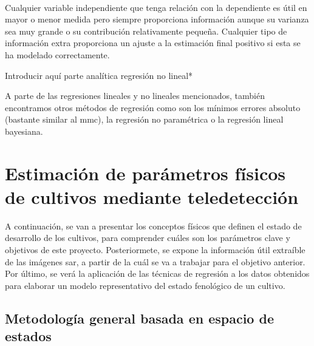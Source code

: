 \\
\par Cualquier variable independiente que tenga relación con la dependiente es útil en mayor o menor medida pero siempre proporciona información aunque su varianza sea muy grande o su contribución relativamente pequeña. Cualquier tipo de información extra proporciona un ajuste a la estimación final positivo si esta se ha modelado correctamente. 
\\
\par *Introducir aquí parte analítica regresión no lineal*
\\
\par A parte de las regresiones lineales y no lineales mencionados, también encontramos otros métodos de regresión como son los mínimos errores absoluto (bastante similar al \gls{mmc}), la regresión no paramétrica o la regresión lineal bayesiana.

\section{Estimación de parámetros físicos de cultivos mediante teledetección}
\par A continuación, se van a presentar los conceptos físicos que definen el estado de desarrollo de los cultivos, para comprender cuáles son los parámetros clave y objetivos de este proyecto. Posteriormete, se expone la información útil extraíble de las imágenes \gls{sar}, a partir de la cuál se va a trabajar para el objetivo anterior. Por último, se verá la aplicación de las técnicas de regresión a los datos obtenidos para elaborar un modelo representativo del estado fenológico de un cultivo.

\subsection{Metodología general basada en espacio de estados}
